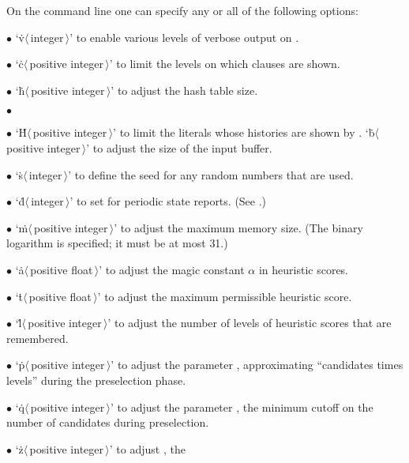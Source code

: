 On the command line one can specify any or all of the following options:
\smallskip
\item{$\bullet$}
`\.v$\langle\,$integer$\,\rangle$' to enable various levels of verbose
output on .
\item{$\bullet$}
`\.c$\langle\,$positive integer$\,\rangle$' to limit the levels on which
clauses are shown.
\item{$\bullet$}
`\.h$\langle\,$positive integer$\,\rangle$' to adjust the hash table size.
\item{$\bullet$}
\item{$\bullet$}
`\.H$\langle\,$positive integer$\,\rangle$' to limit the literals whose
histories are shown by .
`\.b$\langle\,$positive integer$\,\rangle$' to adjust the size of the input
buffer.
\item{$\bullet$}
`\.s$\langle\,$integer$\,\rangle$' to define the seed for any random numbers
that are used.
\item{$\bullet$}
`\.d$\langle\,$integer$\,\rangle$' to set  for periodic state
reports.
(See .)
\item{$\bullet$}
`\.m$\langle\,$positive integer$\,\rangle$' to adjust the maximum memory size.
(The binary logarithm is specified; it must be at most 31.)
\item{$\bullet$}
`\.a$\langle\,$positive float$\,\rangle$' to adjust the magic constant
$\alpha$ in heuristic scores.
\item{$\bullet$}
`\.t$\langle\,$positive float$\,\rangle$' to adjust the maximum permissible
heuristic score.
\item{$\bullet$}
`\.l$\langle\,$positive integer$\,\rangle$' to adjust the number of levels
of heuristic scores that are remembered.
\item{$\bullet$}
`\.p$\langle\,$positive integer$\,\rangle$' to adjust the parameter
, approximating ``candidates times levels'' during the
preselection phase.
\item{$\bullet$}
`\.q$\langle\,$positive integer$\,\rangle$' to adjust the parameter
, the minimum cutoff on the number of candidates during
preselection.
\item{$\bullet$}
`\.z$\langle\,$positive integer$\,\rangle$' to adjust , the
